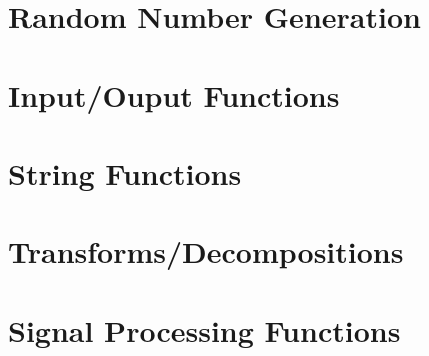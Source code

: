 \documentclass{book}
\begin{document}
\chapter{Random Number Generation}
















\chapter{Input/Ouput Functions}







































\chapter{String Functions}

















\chapter{Transforms/Decompositions}











\chapter{Signal Processing Functions}


\end{document}
